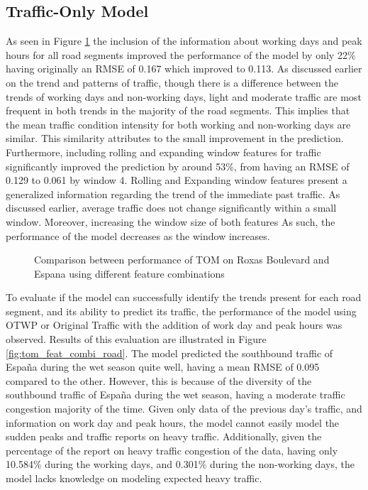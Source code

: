 \subsection{Traffic-Only Model}
As seen in Figure \ref{fig:tom_diff_feat_combi} the inclusion of the information about working days and peak hours for all road segments improved the performance of the model by only 22\% having originally an RMSE of 0.167 which improved to 0.113. As discussed earlier on the trend and patterns of traffic, though there is a difference between the trends of working days and non-working days, light and moderate traffic are most frequent in both trends in the majority of the road segments. This implies that the mean traffic condition intensity for both working and non-working days are similar. This similarity attributes to the small improvement in the prediction. Furthermore, including rolling and expanding window features for traffic significantly improved the prediction by around 53\%, from having an RMSE of 0.129 to 0.061 by window 4. Rolling and Expanding window features present a generalized information regarding the trend of the immediate past traffic. As discussed earlier, average traffic does not change significantly within a small window. Moreover, increasing the window size of both features As such, the performance of the model decreases as the window increases. 

\begin{figure}[h]
  \centering
  \captionsetup{justification=centering}
  \caption{Comparison between performance of TOM on Roxas Boulevard and Espana using different feature combinations}
  \label{fig:tom_diff_feat_combi}
\end{figure}

To evaluate if the model can successfully identify the trends present for each road segment, and its ability to predict its traffic, the performance of the model using OTWP or Original Traffic with the addition of work day and peak hours was observed. Results of this evaluation are illustrated in Figure \ref{fig:tom_feat_combi_road}. The model predicted the southbound traffic of España during the wet season quite well, having a mean RMSE of 0.095 compared to the other. However, this is because of the diversity of the southbound traffic of España during the wet season, having a moderate traffic congestion majority of the time. Given only data of the previous day’s traffic, and information on work day and peak hours, the model cannot easily model the sudden peaks and traffic reports on heavy traffic. Additionally, given the percentage of the report on heavy traffic congestion of the data, having only 10.584\% during the working days, and 0.301\% during the non-working days, the model lacks knowledge on modeling expected heavy traffic. 

